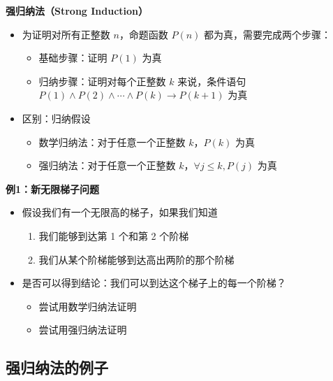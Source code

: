 \documentclass[UTF8]{report}
\theoremstyle{MyLineTheoremStyle} %
\theoremstyle{MyBlockTheoremStyle} %
\theoremstyle{MySubsubsectionStyle} %
\begin{document}
        \textbf{强归纳法（Strong Induction）}
        \begin{itemize}
            \item 为证明对所有正整数 $n$，命题函数 $P(n)$ 都为真，需要完成两个步骤：
            \begin{itemize}
                \item 基础步骤：证明 $P(1)$ 为真
                \item 归纳步骤：证明对每个正整数 $k$ 来说，条件语句 $P(1) \land P(2) \land \cdots \land P(k) \rightarrow P(k+1)$ 为真
            \end{itemize}
            \item 区别：归纳假设
            \begin{itemize}
                \item 数学归纳法：对于任意一个正整数 $k$，$P(k)$ 为真
                \item 强归纳法：对于任意一个正整数 $k$，$\forall j \leq k, P(j)$ 为真
            \end{itemize}
        \end{itemize}
        
        \textbf{例1：新无限梯子问题}
        \begin{itemize}
            \item 假设我们有一个无限高的梯子，如果我们知道
            \begin{enumerate}
                \item 我们能够到达第 1 个和第 2 个阶梯
                \item 我们从某个阶梯能够到达高出两阶的那个阶梯
            \end{enumerate}
            \item 是否可以得到结论：我们可以到达这个梯子上的每一个阶梯？
            \begin{itemize}
                \item 尝试用数学归纳法证明
                \item 尝试用强归纳法证明
            \end{itemize}
        \end{itemize}
        
        \subsection{强归纳法的例子}
        
\end{document}
